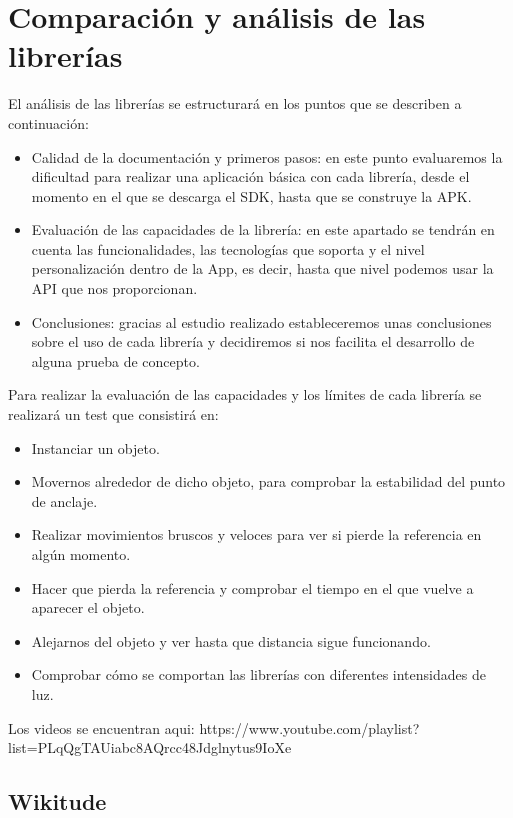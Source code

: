 
\chapter{Comparación y análisis de las librerías}

El análisis de las librerías se estructurará en los puntos que se describen a continuación:
\begin{itemize}
\item Calidad de la documentación y primeros pasos: en este punto evaluaremos la dificultad para realizar una aplicación básica con cada librería, desde el momento en el que se descarga el SDK, hasta que se construye la APK. 
\item Evaluación de las capacidades de la librería: en este apartado se tendrán en cuenta las funcionalidades, las tecnologías que soporta y el nivel personalización dentro de la App, es decir, hasta que nivel podemos usar la API que nos proporcionan.
\item Conclusiones: gracias al estudio realizado estableceremos unas conclusiones sobre el uso de cada librería y decidiremos si nos facilita el desarrollo de alguna prueba de concepto.
\end{itemize}


Para realizar la evaluación de las capacidades y los límites de cada librería se realizará un test que consistirá en:
\begin{itemize}
\item Instanciar un objeto.
\item Movernos alrededor de dicho objeto, para comprobar la estabilidad del punto de anclaje.
\item Realizar movimientos bruscos y veloces para ver si pierde la referencia en algún momento.
\item Hacer que pierda la referencia y comprobar el tiempo en el que vuelve a aparecer el objeto.
\item Alejarnos del objeto y ver hasta que distancia sigue funcionando.
\item Comprobar cómo se comportan las librerías con diferentes intensidades de luz.
\end{itemize}
Los videos se encuentran aqui: https://www.youtube.com/playlist?list=PLqQgTAUiabc8AQrcc48Jdglnytus9IoXe
\clearpage
\section{Wikitude}

